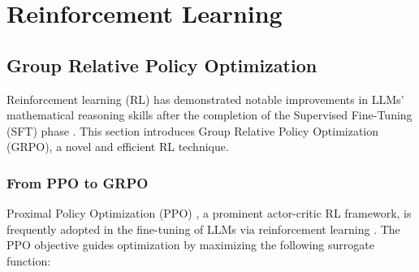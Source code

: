 \section{Reinforcement Learning}

\subsection{Group Relative Policy Optimization}
Reinforcement learning (RL) has demonstrated notable improvements in LLMs’ mathematical reasoning skills after the completion of the Supervised Fine-Tuning (SFT) phase \citep{wang2023math,wizardmath}. This section introduces Group Relative Policy Optimization (GRPO), a novel and efficient RL technique.

\subsubsection{From PPO to GRPO}
Proximal Policy Optimization (PPO) \citep{schulman2017proximal}, a prominent actor-critic RL framework, is frequently adopted in the fine-tuning of LLMs via reinforcement learning \citep{ouyang2022training}. The PPO objective guides optimization by maximizing the following surrogate function:

